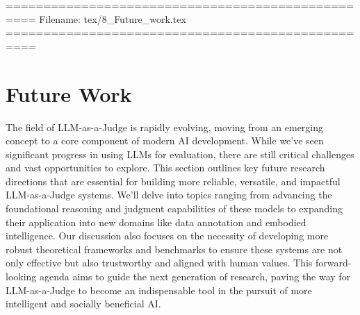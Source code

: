 

==================================================
Filename: tex/8_Future_work.tex
==================================================



\section{Future Work}\label{sec:future_work}
The field of LLM-as-a-Judge is rapidly evolving, moving from an emerging concept to a core component of modern AI development. While we've seen significant progress in using LLMs for evaluation, there are still critical challenges and vast opportunities to explore. This section outlines key future research directions that are essential for building more reliable, versatile, and impactful LLM-as-a-Judge systems. We'll delve into topics ranging from advancing the foundational reasoning and judgment capabilities of these models to expanding their application into new domains like data annotation and embodied intelligence. Our discussion also focuses on the necessity of developing more robust theoretical frameworks and benchmarks to ensure these systems are not only effective but also trustworthy and aligned with human values. This forward-looking agenda aims to guide the next generation of research, paving the way for LLM-as-a-Judge to become an indispensable tool in the pursuit of more intelligent and socially beneficial AI.






